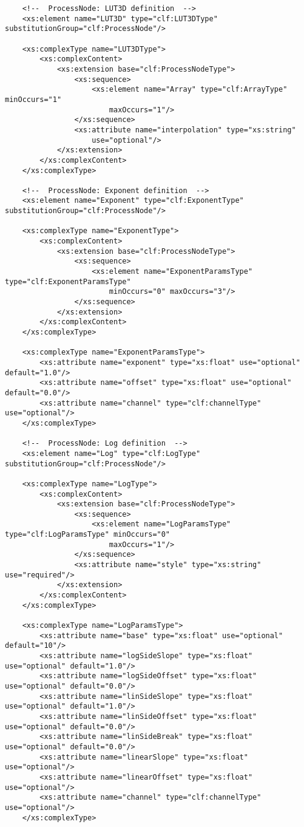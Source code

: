 \begin{lstlisting}
    <!--  ProcessNode: LUT3D definition  -->
    <xs:element name="LUT3D" type="clf:LUT3DType" substitutionGroup="clf:ProcessNode"/>
    
    <xs:complexType name="LUT3DType">
        <xs:complexContent>
            <xs:extension base="clf:ProcessNodeType">
                <xs:sequence>
                    <xs:element name="Array" type="clf:ArrayType" minOccurs="1" 
                        maxOccurs="1"/>
                </xs:sequence>
                <xs:attribute name="interpolation" type="xs:string" 
                    use="optional"/>
            </xs:extension>
        </xs:complexContent>
    </xs:complexType>
    
    <!--  ProcessNode: Exponent definition  -->
    <xs:element name="Exponent" type="clf:ExponentType" substitutionGroup="clf:ProcessNode"/>
    
    <xs:complexType name="ExponentType">
        <xs:complexContent>
            <xs:extension base="clf:ProcessNodeType">
                <xs:sequence>
                    <xs:element name="ExponentParamsType" type="clf:ExponentParamsType" 
                        minOccurs="0" maxOccurs="3"/>
                </xs:sequence>
            </xs:extension>
        </xs:complexContent>
    </xs:complexType>
    
    <xs:complexType name="ExponentParamsType">
        <xs:attribute name="exponent" type="xs:float" use="optional" default="1.0"/>
        <xs:attribute name="offset" type="xs:float" use="optional" default="0.0"/>
        <xs:attribute name="channel" type="clf:channelType" use="optional"/>
    </xs:complexType>

    <!--  ProcessNode: Log definition  -->
    <xs:element name="Log" type="clf:LogType" substitutionGroup="clf:ProcessNode"/>
    
    <xs:complexType name="LogType">
        <xs:complexContent>
            <xs:extension base="clf:ProcessNodeType">
                <xs:sequence>
                    <xs:element name="LogParamsType" type="clf:LogParamsType" minOccurs="0" 
                        maxOccurs="1"/>
                </xs:sequence>                
                <xs:attribute name="style" type="xs:string" use="required"/>
            </xs:extension>
        </xs:complexContent>        
    </xs:complexType>

    <xs:complexType name="LogParamsType">
        <xs:attribute name="base" type="xs:float" use="optional" default="10"/>
        <xs:attribute name="logSideSlope" type="xs:float" use="optional" default="1.0"/>
        <xs:attribute name="logSideOffset" type="xs:float" use="optional" default="0.0"/>
        <xs:attribute name="linSideSlope" type="xs:float" use="optional" default="1.0"/>
        <xs:attribute name="linSideOffset" type="xs:float" use="optional" default="0.0"/>
        <xs:attribute name="linSideBreak" type="xs:float" use="optional" default="0.0"/>
        <xs:attribute name="linearSlope" type="xs:float" use="optional"/>
        <xs:attribute name="linearOffset" type="xs:float" use="optional"/>
        <xs:attribute name="channel" type="clf:channelType" use="optional"/>
    </xs:complexType>
    

\end{lstlisting}
